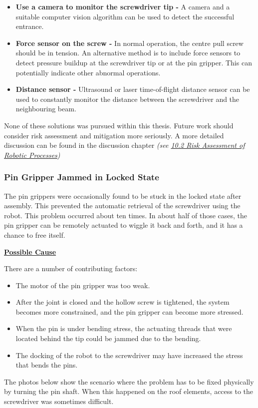 \documentclass[11pt]{book}
\begin{document}
\begin{itemize}
	\item \textbf{Use a camera to monitor the screwdriver tip - }A camera and a suitable computer vision algorithm can be used to detect the successful entrance.

	\item \textbf{Force sensor on the screw - }In normal operation, the centre pull screw should be in tension. An alternative method is to include force sensors to detect pressure buildup at the screwdriver tip or at the pin gripper. This can potentially indicate other abnormal operations.

	\item \textbf{Distance sensor -} Ultrasound or laser time-of-flight distance sensor can be used to constantly monitor the distance between the screwdriver and the neighbouring beam.

\end{itemize}
None of these solutions was pursued within this thesis. Future work should consider risk assessment and mitigation more seriously. A more detailed discussion can be found in the discussion chapter \textit{(see \uline{10.2 Risk Assessment of Robotic Processes})}

\subsubsection{Pin Gripper Jammed in Locked State}

The pin grippers were occasionally found to be stuck in the locked state after assembly. This prevented the automatic retrieval of the screwdriver using the robot. This problem occurred about ten times. In about half of those cases, the pin gripper can be remotely actuated to wiggle it back and forth, and it has a chance to free itself.

\textbf{\uline{Possible Cause}}

There are a number of contributing factors:

\begin{itemize}
	\item The motor of the pin gripper was too weak.

	\item After the joint is closed and the hollow screw is tightened, the system becomes more constrained, and the pin gripper can become more stressed.

	\item When the pin is under bending stress, the actuating threads that were located behind the tip could be jammed due to the bending. 

	\item The docking of the robot to the screwdriver may have increased the stress that bends the pins.

\end{itemize}
The photos below show the scenario where the problem has to be fixed physically by turning the pin shaft. When this happened on the roof elements, access to the screwdriver was sometimes difficult.
\end{document}
